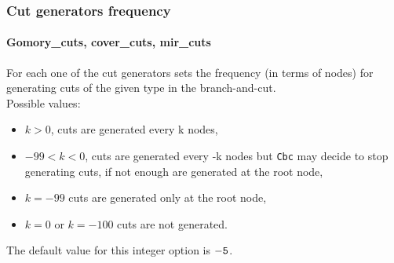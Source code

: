 \subsubsection{Cut generators frequency}
\paragraph{Gomory\_cuts, cover\_cuts, mir\_cuts}
For each one of the cut generators sets the frequency (in terms of nodes) for generating cuts of
the given type in the branch-and-cut.\\
Possible values:
\begin{itemize}
\item $k > 0$, cuts are generated every k nodes,
\item $-99 < k < 0$,  cuts are generated every -k nodes but
{\tt Cbc} may decide to stop generating cuts, if not
enough are generated at the root node,
\item$k = -99$ cuts are generated only at the root node,
\item $k = 0$ or $k = -100$ cuts are not generated.
\end{itemize}
 The default value for this integer option is ${\tt -5}$.
